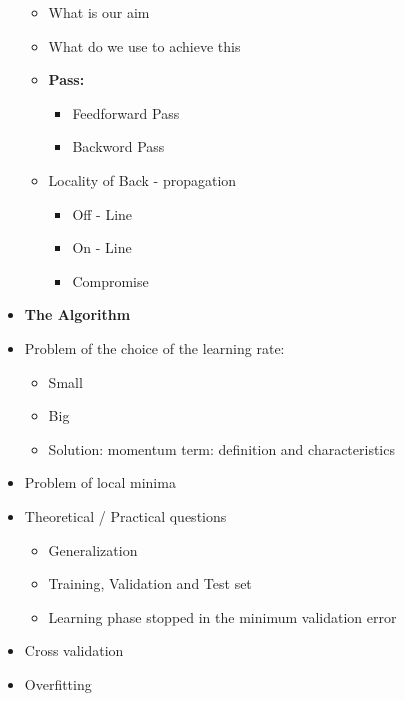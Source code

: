 \documentclass[12pt,oneside]{report}
\begin{document}
\begin{itemize}
\begin{itemize}
        \item What is our aim
        \item What do we use to achieve this
        \item \textbf{Pass:}
        \begin{itemize}
            \item Feedforward Pass
            \item Backword Pass
        \end{itemize}
        \item Locality of Back - propagation
        \begin{itemize}
            \item Off - Line
            \item On - Line
            \item Compromise
        \end{itemize}
    \end{itemize}
    \item \textbf{The Algorithm}
    \item Problem of the choice of the learning rate:
    \begin{itemize}
        \item Small
        \item Big
        \item Solution: momentum term: definition and characteristics
    \end{itemize}
    \item Problem of local minima
    \item Theoretical / Practical questions
    \begin{itemize}
        \item Generalization
        \item Training, Validation and Test set
        \item Learning phase stopped in the minimum validation error
    \end{itemize}
    \item Cross validation
    \item Overfitting
\end{itemize}
\end{document}
